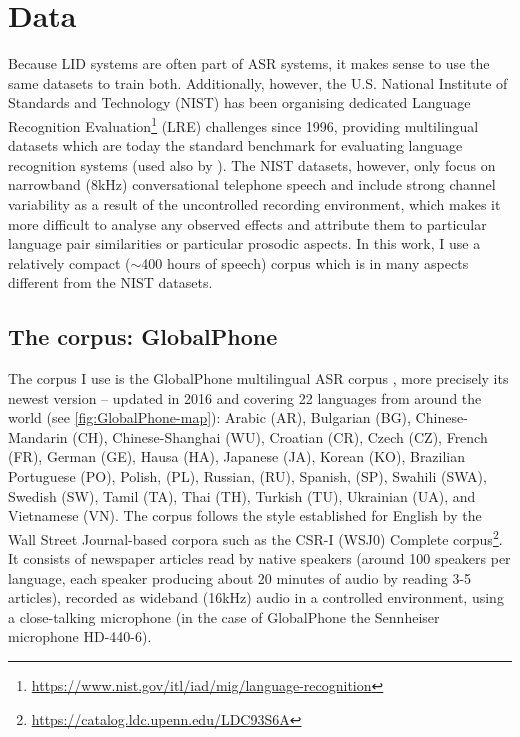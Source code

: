 \documentclass[bsc,frontabs,twoside,singlespacing,parskip,deptreport]{infthesis}
\begin{document}
\chapter{Data}{
  \label{chap:Data}
  Because LID systems are often part of ASR systems, it makes sense to use the same datasets to train both.
  Additionally, however, the U.S. National Institute of Standards and Technology (NIST) has been organising dedicated Language Recognition Evaluation\footnote{\url{https://www.nist.gov/itl/iad/mig/language-recognition}} (LRE) challenges since 1996, providing multilingual datasets which are today the standard benchmark for evaluating language recognition systems (used also by \citet{Snyder_et_al_2018}). The NIST datasets, however, only focus on narrowband (8kHz) conversational telephone speech and include strong channel variability as a result of the uncontrolled recording environment, which makes it more difficult to analyse any observed effects and attribute them to particular language pair similarities or particular prosodic aspects.
  In this work, I use a relatively compact ($\sim$400 hours of speech) corpus which is in many aspects different from the NIST datasets.

  \section{The corpus: GlobalPhone}{
    \label{sec:GlobalPhone}    
    The corpus I use is the GlobalPhone multilingual ASR corpus \citep{Schultz_et_al_2013}, more precisely its newest version -- updated in 2016 and covering 22 languages from around the world (see \autoref{fig:GlobalPhone-map}): Arabic (AR), Bulgarian (BG), Chinese-Mandarin (CH), Chinese-Shanghai (WU), Croatian (CR), Czech (CZ), French (FR), German (GE), Hausa (HA), Japanese (JA), Korean (KO), Brazilian Portuguese (PO), Polish, (PL), Russian, (RU), Spanish, (SP), Swahili (SWA), Swedish (SW), Tamil (TA), Thai (TH), Turkish (TU), Ukrainian (UA), and Vietnamese (VN). The corpus follows the style established for English by the Wall Street Journal-based corpora \citep{Paul_Baker_1992} such as the CSR-I (WSJ0) Complete corpus\footnote{\url{https://catalog.ldc.upenn.edu/LDC93S6A}}. It consists of newspaper articles read by native speakers (around 100 speakers per language, each speaker producing about 20 minutes of audio by reading 3-5 articles), recorded as wideband (16kHz) audio in a controlled environment, using a close-talking microphone (in the case of GlobalPhone the Sennheiser microphone HD-440-6).

}}
\end{document}
